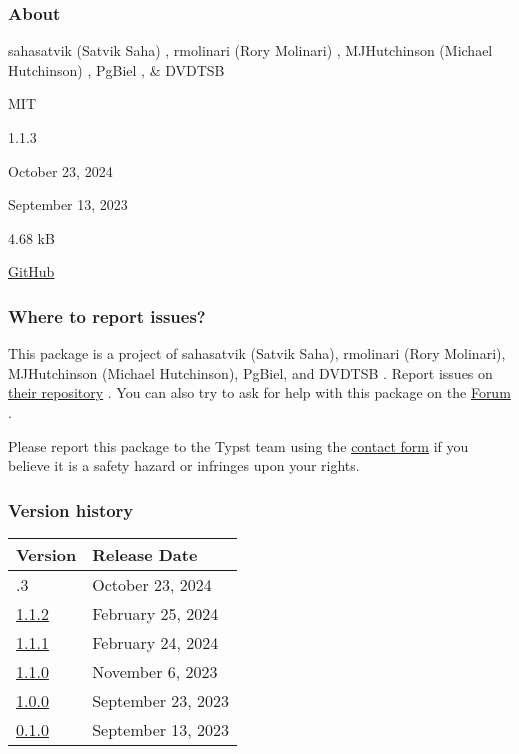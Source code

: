 \subsubsection{About}\label{about}

\begin{description}
\tightlist
\item[Author s :]
sahasatvik (Satvik Saha) , rmolinari (Rory Molinari) , MJHutchinson
(Michael Hutchinson) , PgBiel , \& DVDTSB
\item[License:]
MIT
\item[Current version:]
1.1.3
\item[Last updated:]
October 23, 2024
\item[First released:]
September 13, 2023
\item[Archive size:]
4.68 kB
\href{https://packages.typst.org/preview/ctheorems-1.1.3.tar.gz}{\pandocbounded{}}
\item[Repository:]
\href{https://github.com/sahasatvik/typst-theorems}{GitHub}
\end{description}

\subsubsection{Where to report issues?}\label{where-to-report-issues}

This package is a project of sahasatvik (Satvik Saha), rmolinari (Rory
Molinari), MJHutchinson (Michael Hutchinson), PgBiel, and DVDTSB .
Report issues on
\href{https://github.com/sahasatvik/typst-theorems}{their repository} .
You can also try to ask for help with this package on the
\href{https://forum.typst.app}{Forum} .

Please report this package to the Typst team using the
\href{https://typst.app/contact}{contact form} if you believe it is a
safety hazard or infringes upon your rights.

\label{versions}
\subsubsection{Version history}\label{version-history}

\begin{longtable}[]{@{}ll@{}}
\toprule\noalign{}
Version & Release Date \\
\midrule\noalign{}
\endhead
\bottomrule\noalign{}
\endlastfoot
1.1.3 & October 23, 2024 \\
\href{https://typst.app/universe/package/ctheorems/1.1.2/}{1.1.2} &
February 25, 2024 \\
\href{https://typst.app/universe/package/ctheorems/1.1.1/}{1.1.1} &
February 24, 2024 \\
\href{https://typst.app/universe/package/ctheorems/1.1.0/}{1.1.0} &
November 6, 2023 \\
\href{https://typst.app/universe/package/ctheorems/1.0.0/}{1.0.0} &
September 23, 2023 \\
\href{https://typst.app/universe/package/ctheorems/0.1.0/}{0.1.0} &
September 13, 2023 \\
\end{longtable}

